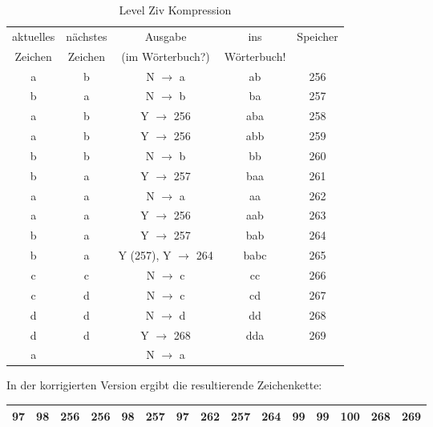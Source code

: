 \documentclass[12pt,german]{article}
\begin{document}

\label{fig: manualLemperZivPdf}


\begin{table}[H]
  \centering
  \begin{tabular}{c | c | c | c | c |}
    \hline
   	aktuelles  & nächstes  & Ausgabe  & ins & Speicher \\
   	 Zeichen &  Zeichen &  (im Wörterbuch?) & Wörterbuch! &  \\
	a & b & N $ \rightarrow $ a & ab & 256 \\
	b & a & N $ \rightarrow $ b & ba & 257 \\
	a & b & Y $ \rightarrow $ 256 & aba & 258 \\
	a & b & Y $ \rightarrow $ 256 & abb & 259 \\
	b & b & N $ \rightarrow $ b & bb & 260 \\
	b & a & Y $ \rightarrow $ 257 & baa & 261 \\
	a & a & N $ \rightarrow $ a & aa & 262 \\
	a & a & Y $ \rightarrow $ 256 & aab & 263 \\
	b & a & Y $ \rightarrow $ 257 & bab & 264 \\
	b & a & Y (257), Y $ \rightarrow $ 264 & babc & 265 \\
	c & c & N $ \rightarrow $ c & cc & 266 \\
	c & d & N $ \rightarrow $ c & cd & 267 \\
	d & d & N $ \rightarrow $ d & dd & 268 \\
	d & d & Y $ \rightarrow $ 268 & dda & 269 \\
	a &   & N $ \rightarrow $ a &     &   \\ 
   	
  \end{tabular}
  \caption{Level Ziv Kompression}
  \label{tab:Level Ziv Kompression}
\end{table}

In der korrigierten Version ergibt die resultierende Zeichenkette: 

\begin{table}[H]
  \centering
  \begin{tabular}{| c | c | c | c | c | c | c | c | c | c | c | c | c | c | c |}
    \hline
    97 & 98& 256 & 256 & 98 & 257 & 97 & 262 & 257 & 264 & 99 & 99 & 100 & 268 & 269 \\
    \hline
  \end{tabular}
\end{table}
\end{document}
